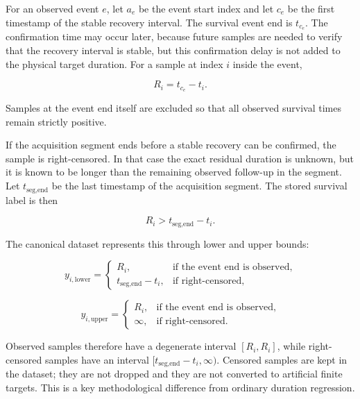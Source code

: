 For an observed event \(e\), let \(a_e\) be the event start index and let
\(c_e\) be the first timestamp of the stable recovery interval. The survival
event end is \(t_{c_e}\). The confirmation time may occur later, because future
samples are needed to verify that the recovery interval is stable, but this
confirmation delay is not added to the physical target duration. For a sample
at index \(i\) inside the event,

\[
  R_i = t_{c_e} - t_i .
\]

Samples at the event end itself are excluded so that all observed survival
times remain strictly positive.

If the acquisition segment ends before a stable recovery can be confirmed, the
sample is right-censored. In that case the exact residual duration is unknown,
but it is known to be longer than the remaining observed follow-up in the
segment. Let \(t_{\text{seg,end}}\) be the last timestamp of the acquisition
segment. The stored survival label is then

\[
  R_i > t_{\text{seg,end}} - t_i .
\]

The canonical dataset represents this through lower and upper bounds:

\[
  y_{i,\text{lower}} =
  \begin{cases}
    R_i, & \text{if the event end is observed},\\
    t_{\text{seg,end}}-t_i, & \text{if right-censored},
  \end{cases}
\]

\[
  y_{i,\text{upper}} =
  \begin{cases}
    R_i, & \text{if the event end is observed},\\
    \infty, & \text{if right-censored}.
  \end{cases}
\]

Observed samples therefore have a degenerate interval
\([R_i,R_i]\), while right-censored samples have an interval
\([t_{\text{seg,end}}-t_i,\infty)\). Censored samples are kept in the dataset;
they are not dropped and they are not converted to artificial finite targets.
This is a key methodological difference from ordinary duration regression.

